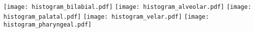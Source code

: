 \documentclass[varwidth=7in]{standalone}
\begin{document}
\texttt{[image: histogram\_bilabial.pdf]}%
\texttt{[image: histogram\_alveolar.pdf]}%
\texttt{[image: histogram\_palatal.pdf]}%
\texttt{[image: histogram\_velar.pdf]}%
\texttt{[image: histogram\_pharyngeal.pdf]}
\end{document}

